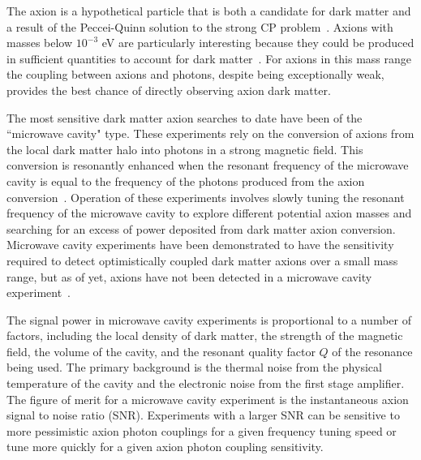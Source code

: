 \documentclass[aps,prl,twocolumn,groupedaddress]{revtex4-1}
\begin{document}
\maketitle

The axion is a hypothetical particle that is both a candidate for dark matter and a result of the Peccei-Quinn solution to the strong CP problem~\cite{Peccei,Peccei_2,PhysRevLett.40.223,PhysRevLett.40.279,Preskill1983127,Abbott1983,ipser-sikivie}.
Axions with masses below $10^{-3}$ eV are particularly interesting because they could be produced in sufficient quantities to account for dark matter~\cite{Turner199067}.
For axions in this mass range the coupling between axions and photons, despite being exceptionally weak, provides the best chance of directly observing axion dark matter.

The most sensitive dark matter axion searches to date have been of the ``microwave cavity" type.
These experiments rely on the conversion of axions from the local dark matter halo into photons in a strong magnetic field.
This conversion is resonantly enhanced when the resonant frequency of the microwave cavity is equal to the frequency of the photons produced from the axion conversion~\cite{PhysRevLett.51.1415}.
Operation of these experiments involves slowly tuning the resonant frequency of the microwave cavity to explore different potential axion masses and searching for an excess of power deposited from dark matter axion conversion.
Microwave cavity experiments have been demonstrated to have the sensitivity required to detect optimistically coupled dark matter axions over a small mass range, but as of yet, axions have not been detected in a microwave cavity experiment~\cite{PhysRevLett.104.041301}.

The signal power in microwave cavity experiments is proportional to a number of factors, including the local density of dark matter, the strength of the magnetic field, the volume of the cavity, and the resonant quality factor $Q$ of the resonance being used.
The primary background is the thermal noise from the physical temperature of the cavity and the electronic noise from the first stage amplifier.  
The figure of merit for a microwave cavity experiment is the instantaneous axion signal to noise ratio (SNR).
Experiments with a larger SNR can be sensitive to more pessimistic axion photon couplings for a given frequency tuning speed or tune more quickly for a given axion photon coupling sensitivity.
\end{document}

